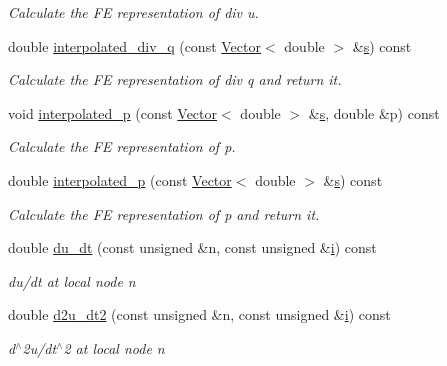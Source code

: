 \begin{DoxyCompactItemize}
\begin{DoxyCompactList}\small\item\em Calculate the FE representation of div u. \end{DoxyCompactList}\item 
double \hyperlink{classoomph_1_1AxisymmetricPoroelasticityEquations_a347ef10c5a8d90bae243072cc6b1510f}{interpolated\+\_\+div\+\_\+q} (const \hyperlink{classoomph_1_1Vector}{Vector}$<$ double $>$ \&\hyperlink{cfortran_8h_ab7123126e4885ef647dd9c6e3807a21c}{s}) const
\begin{DoxyCompactList}\small\item\em Calculate the FE representation of div q and return it. \end{DoxyCompactList}\item 
void \hyperlink{classoomph_1_1AxisymmetricPoroelasticityEquations_aa94e8cbc21d4433ead328a8a365162ff}{interpolated\+\_\+p} (const \hyperlink{classoomph_1_1Vector}{Vector}$<$ double $>$ \&\hyperlink{cfortran_8h_ab7123126e4885ef647dd9c6e3807a21c}{s}, double \&p) const
\begin{DoxyCompactList}\small\item\em Calculate the FE representation of p. \end{DoxyCompactList}\item 
double \hyperlink{classoomph_1_1AxisymmetricPoroelasticityEquations_abcc938c4746b72a49ac6e45a5f6366b1}{interpolated\+\_\+p} (const \hyperlink{classoomph_1_1Vector}{Vector}$<$ double $>$ \&\hyperlink{cfortran_8h_ab7123126e4885ef647dd9c6e3807a21c}{s}) const
\begin{DoxyCompactList}\small\item\em Calculate the FE representation of p and return it. \end{DoxyCompactList}\item 
double \hyperlink{classoomph_1_1AxisymmetricPoroelasticityEquations_a5544e6c2ff2d40788b45a114ed1ccfd2}{du\+\_\+dt} (const unsigned \&n, const unsigned \&\hyperlink{cfortran_8h_adb50e893b86b3e55e751a42eab3cba82}{i}) const
\begin{DoxyCompactList}\small\item\em du/dt at local node n \end{DoxyCompactList}\item 
double \hyperlink{classoomph_1_1AxisymmetricPoroelasticityEquations_ac5a86eb17bdc912476cce98eef4d0ffc}{d2u\+\_\+dt2} (const unsigned \&n, const unsigned \&\hyperlink{cfortran_8h_adb50e893b86b3e55e751a42eab3cba82}{i}) const
\begin{DoxyCompactList}\small\item\em d$^\wedge$2u/dt$^\wedge$2 at local node n \end{DoxyCompactList}\item 

\end{DoxyCompactItemize}
